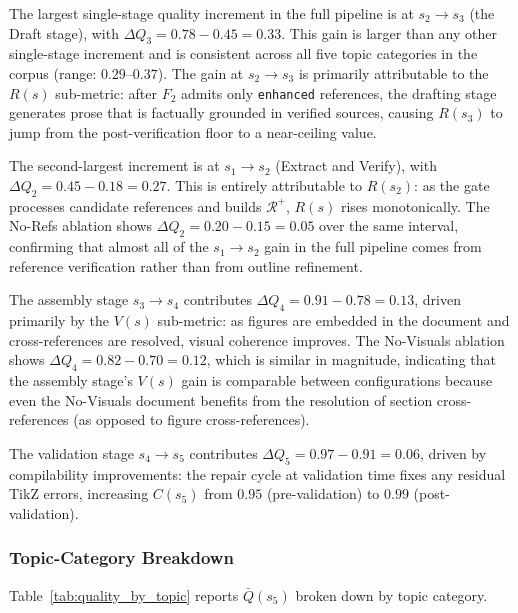The largest single-stage quality increment in the full pipeline is at $s_2\to s_3$
(the Draft stage), with $\Delta Q_3 = 0.78 - 0.45 = 0.33$.
This gain is larger than any other single-stage increment and is consistent across
all five topic categories in the corpus (range: $0.29$--$0.37$).
The gain at $s_2\to s_3$ is primarily attributable to the $R(s)$ sub-metric:
after $F_2$ admits only \texttt{enhanced} references, the drafting stage generates
prose that is factually grounded in verified sources, causing $R(s_3)$ to jump
from the post-verification floor to a near-ceiling value.

The second-largest increment is at $s_1\to s_2$ (Extract and Verify), with
$\Delta Q_2 = 0.45 - 0.18 = 0.27$.
This is entirely attributable to $R(s_2)$: as the \cgrag{} gate processes candidate
references and builds $\mathcal{R}^+$, $R(s)$ rises monotonically.
The No-Refs ablation shows $\Delta Q_2 = 0.20 - 0.15 = 0.05$ over the same interval,
confirming that almost all of the $s_1\to s_2$ gain in the full pipeline comes from
reference verification rather than from outline refinement.

The assembly stage $s_3\to s_4$ contributes $\Delta Q_4 = 0.91 - 0.78 = 0.13$,
driven primarily by the $V(s)$ sub-metric: as figures are embedded in the document
and cross-references are resolved, visual coherence improves.
The No-Visuals ablation shows $\Delta Q_4 = 0.82 - 0.70 = 0.12$, which is similar
in magnitude, indicating that the assembly stage's $V(s)$ gain is comparable
between configurations because even the No-Visuals document benefits from
the resolution of section cross-references (as opposed to figure cross-references).

The validation stage $s_4\to s_5$ contributes $\Delta Q_5 = 0.97 - 0.91 = 0.06$,
driven by compilability improvements: the \tvg{} repair cycle at validation time
fixes any residual TikZ errors, increasing $C(s_5)$ from $0.95$ (pre-validation)
to $0.99$ (post-validation).

\subsubsection*{Topic-Category Breakdown}

Table~\ref{tab:quality_by_topic} reports $\bar{Q}(s_5)$ broken down by topic category.


